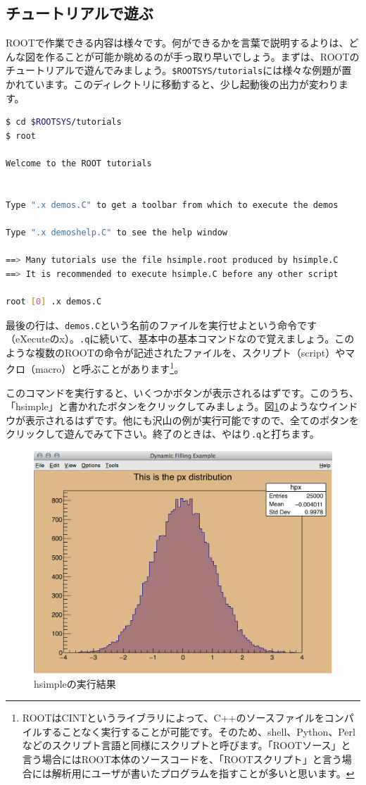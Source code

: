 \subsection{チュートリアルで遊ぶ}
\label{subsec_tutorial}
ROOTで作業できる内容は様々です。何ができるかを言葉で説明するよりは、どんな図を作ることが可能か眺めるのが手っ取り早いでしょう。まずは、ROOTのチュートリアルで遊んでみましょう。\texttt{\$ROOTSYS/tutorials}には様々な例題が置かれています。このディレクトリに移動すると、少し起動後の出力が変わります。
\begin{lstlisting}[language=bash]
$ cd $ROOTSYS/tutorials
$ root

Welcome to the ROOT tutorials


Type ".x demos.C" to get a toolbar from which to execute the demos

Type ".x demoshelp.C" to see the help window

==> Many tutorials use the file hsimple.root produced by hsimple.C
==> It is recommended to execute hsimple.C before any other script

root [0] .x demos.C
\end{lstlisting}
最後の行は、\texttt{demos.C}という名前のファイルを実行せよという命令です（eXecuteのx）。\texttt{.q}に続いて、基本中の基本コマンドなので覚えましょう。このような複数のROOTの命令が記述されたファイルを、スクリプト（script）やマクロ（macro）と呼ぶことがあります\footnote{ROOTはCINTというライブラリによって、C++のソースファイルをコンパイルすることなく実行することが可能です。そのため、shell、Python、Perlなどのスクリプト言語と同様にスクリプトと呼びます。「ROOTソース」と言う場合にはROOT本体のソースコードを、「ROOTスクリプト」と言う場合には解析用にユーザが書いたプログラムを指すことが多いと思います。}。

このコマンドを実行すると、いくつかボタンが表示されるはずです。このうち、「hsimple」と書かれたボタンをクリックしてみましょう。図\ref{fig_hsimple}のようなウインドウが表示されるはずです。他にも沢山の例が実行可能ですので、全てのボタンをクリックして遊んでみて下さい。終了のときは、やはり\texttt{.q}と打ちます。

\begin{figure}
  \centering
  \includegraphics[width=12cm]{fig/hsimple.png}
  \caption{hsimpleの実行結果}
  \label{fig_hsimple}
\end{figure}

